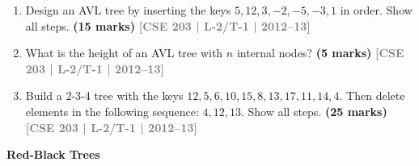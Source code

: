 \documentclass[12pt,a3paper]{article}
\newcommand{\yr}[1]{\hfill\textcolor{gray}{\small\textbf{[#1]}}}
\newcommand{\mk}[1]{\textcolor{orange!70!black}{\small\textbf{(#1 marks)}}}
\newcommand{\subtopic}[2]{%
  \vspace{10pt}
  \noindent\begin{tcolorbox}[colback=#1!8,colframe=#1,boxrule=0.6pt,arc=4pt,
    left=6pt,right=6pt,top=4pt,bottom=4pt]
    \small\bfseries\textcolor{#1}{#2}
  \end{tcolorbox}
  \vspace{2pt}
}
\begin{document}
\begin{enumerate}
\item Design an AVL tree by inserting the keys $5, 12, 3, -2, -5, -3, 1$ in order. Show all steps. \mk{15}
\yr{CSE 203 | L-2/T-1 | 2012--13}


\item What is the height of an AVL tree with $n$ internal nodes? \mk{5}
\yr{CSE 203 | L-2/T-1 | 2012--13}

\item Build a 2-3-4 tree with the keys $12, 5, 6, 10, 15, 8, 13, 17, 11, 14, 4$. Then delete elements in the following sequence: $4, 12, 13$. Show all steps. \mk{25}
\yr{CSE 203 | L-2/T-1 | 2012--13}



\end{enumerate}

\subtopic{cB}{Red-Black Trees}
\label{sub:s2-rbt}
\end{document}
